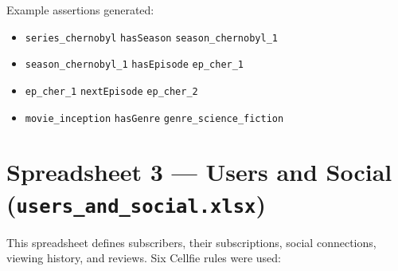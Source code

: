 \vspace{0.3cm}
\noindent Example assertions generated:
\begin{itemize}
    \item \texttt{series\_chernobyl} \texttt{hasSeason} \texttt{season\_chernobyl\_1}
    \item \texttt{season\_chernobyl\_1} \texttt{hasEpisode} \texttt{ep\_cher\_1}
    \item \texttt{ep\_cher\_1} \texttt{nextEpisode} \texttt{ep\_cher\_2}
    \item \texttt{movie\_inception} \texttt{hasGenre} \texttt{genre\_science\_fiction}
\end{itemize}

\vspace{0.5cm}
\section*{Spreadsheet 3 — Users and Social (\texttt{users\_and\_social.xlsx})}

This spreadsheet defines subscribers, their subscriptions, social connections, viewing history, and reviews. Six Cellfie rules were used:

